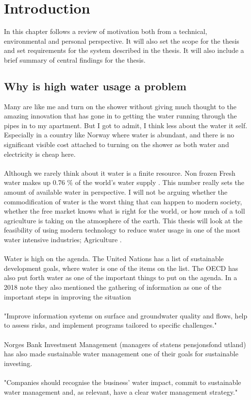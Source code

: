 \documentclass[]{uiophd}
\begin{document}
\chapter{Introduction}

In this chapter follows a review of motivation both from a technical, environmental and personal perspective. It will also set the scope for the thesis and set requirements for the system described in the thesis. It will also include a brief summary of central findings for the thesis.

\section{Why is high water usage a problem}
Many are like me and turn on the shower without giving much thought to the amazing innovation that has gone in to getting the water running through the pipes in to my apartment. But I got to admit, I think less about the water it self. Especially in a country like Norway where water is abundant, and there is no significant visible cost attached to turning on the shower as both water and electricity is cheap here.
\\\\
Although we rarely think about it water is a finite resource. Non frozen Fresh water makes up 0.76 \% of the world's water supply \cite{WaterinCrisis}. This number really sets the amount of available water in perspective. I will not be arguing whether the commodification of water is the worst thing that can happen to modern society, whether the free market knows what is right for the world, or how much of a toll agriculture is taking on the atmosphere of the earth. This thesis will look at the feasibility of using modern technology to reduce water usage in one of the most water intensive industries; Agriculture  \cite{WorldBank}.
\\\\
Water is high on the agenda. The United Nations has a list of sustainable development goals, where water is one of the items on the list. The OECD has also put forth water as one of the important things to put on the agenda. In a 2018 note they also mentioned the gathering of information as one of the important steps in improving the situation 
\\\\
"Improve information systems on surface and groundwater quality and flows, help to assess risks, and implement programs tailored to specific challenges."  \cite{OECD}
\\\\
Norges Bank Investment Management (managers of statens pensjonsfond utland) has also made sustainable water management one of their goals for sustainable investing. 
\\\\
"Companies should recognise the business’
water impact, commit to sustainable water
management and, as relevant, have a clear
water management strategy." \cite{NBIM}
\end{document}
